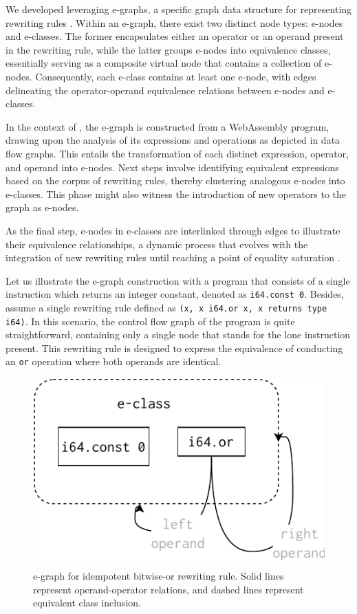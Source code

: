 \label{alg}

We developed \tool leveraging e-graphs, a specific graph data structure for representing rewriting rules \cite{10.1145/3571207}. 
Within an e-graph, there exist two distinct node types: e-nodes and e-classes. 
The former encapsulates either an operator or an operand present in the rewriting rule, while the latter groups e-nodes into equivalence classes, essentially serving as a composite virtual node that contains a collection of e-nodes. 
Consequently, each e-class contains at least one e-node, with edges delineating the operator-operand equivalence relations between e-nodes and e-classes.

In the context of \tool, the e-graph is constructed from a WebAssembly program, drawing upon the analysis of its expressions and operations as depicted in data flow graphs. 
This entails the transformation of each distinct expression, operator, and operand into e-nodes. 
Next steps involve identifying equivalent expressions based on the corpus of rewriting rules, thereby clustering analogous e-nodes into e-classes. 
This phase might also witness the introduction of new operators to the graph as e-nodes.

As the final step, e-nodes in e-classes are interlinked through edges to illustrate their equivalence relationships, a dynamic process that evolves with the integration of new rewriting rules until reaching a point of equality saturation \cite{equality-saturation}.

Let us illustrate the e-graph construction with a program that consists of a single instruction which returns an integer constant, denoted as \texttt{i64.const 0}. 
Besides, assume a single rewriting rule defined as \texttt{(x, x i64.or x, x returns type i64)}.
In this scenario, the control flow graph of the program is quite straightforward, containing only a single node that stands for the lone instruction present. 
This rewriting rule is designed to express the equivalence of conducting an \texttt{or} operation where both operands are identical.



\begin{figure}
  \centering
  \includegraphics[width=0.5\linewidth]{figures/egraph1.pdf}
  \caption{e-graph for idempotent bitwise-or rewriting rule. Solid lines represent operand-operator relations, and dashed lines represent equivalent class inclusion. }
\label{e-graph}
\end{figure}


